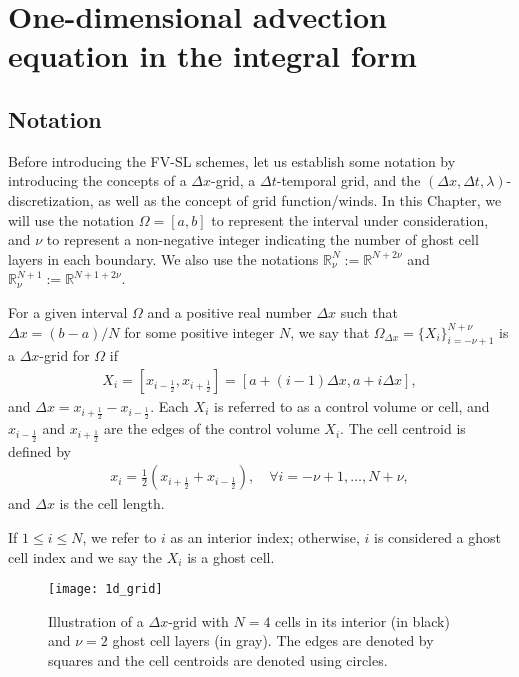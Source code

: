 \section{One-dimensional advection equation in the integral form}
\label{chp-adv1d-sec1}

\subsection{Notation}
\label{chp-adv1d-sec-not}
Before introducing the FV-SL schemes, let us establish some notation by introducing
the concepts of a $\Delta x$-grid, a $\Delta t$-temporal grid, and the
$(\Delta x, \Delta t, \lambda)$-discretization, as well as the concept of grid function/winds.
In this Chapter, we will use the notation $\Omega=[a,b]$ to represent the interval under consideration,
and $\nu$ to represent a non-negative integer indicating the number of ghost cell layers in each boundary.
We also use the notations $\mathbb{R}^{N}_{\nu}:=\mathbb{R}^{N+2\nu}$ and
$\mathbb{R}^{N+1}_{\nu}:=\mathbb{R}^{N+1+2\nu}$.
\begin{definition}\label{chp-adv1d-def-dxgrid}
	For a given interval $\Omega$ and a positive real number $\Delta x$ such that 
    $\Delta x = (b-a)/N$ for some positive integer $N$, 
	we say that $\Omega_{\Delta x}= \{X_i \}_{i=-\nu+1}^{N+\nu}$ is a $\Delta x$-grid for $\Omega$ if
	\begin{align*}
        X_i = [x_{i-\frac{1}{2}},x_{i+\frac{1}{2}}] = [a+(i-1)\Delta x, a+i\Delta x],
    \end{align*}
	and $\Delta x = x_{i+\frac{1}{2}} - x_{i-\frac{1}{2}}$. 
	Each $X_i$ is referred to as a control volume or cell, and $x_{i-\frac{1}{2}}$ and 
	$x_{i+\frac{1}{2}}$ are the edges of the control volume $X_i$.
	The cell centroid is defined by
    \begin{align*}
    x_i = \frac{1}{2}(x_{i+\frac{1}{2}} + x_{i-\frac{1}{2}}),\quad \forall i = -\nu+1, \ldots, N+\nu,
    \end{align*}
	and $\Delta x$ is the cell length.
\end{definition}
\begin{remark}
If $1 \leq i \leq N$, we refer to $i$ as an interior index;
otherwise, $i$ is considered a ghost cell index and we say the $X_i$ is a ghost cell.
\end{remark}

\begin{figure}[!htb]
	\centering
	\texttt{[image: 1d\_grid]}
	\caption{Illustration of a $\Delta x$-grid with $N=4$ cells in its interior (in black) 
         and $\nu=2$ ghost cell layers (in gray).
	 The edges are denoted by squares and the cell centroids are denoted using circles.\label{chp-adv1d-sec1-grid1d}}
\end{figure}

